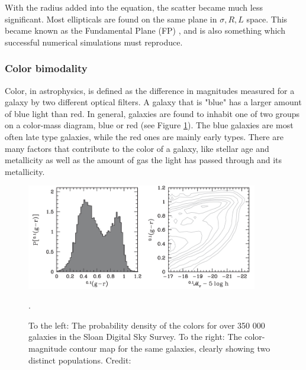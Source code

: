 With the radius added into the equation, the scatter became much less significant. Most ellipticals are found on the same plane in ${\sigma, R, L}$ space. This became known as the Fundamental Plane (FP) \parencite{Djorgovski1987}, and is also something which successful numerical simulations must reproduce.

\subsubsection{Color bimodality}
Color, in astrophysics, is defined as the difference in magnitudes measured for a galaxy by two different optical filters. A galaxy that is "blue" has a larger amount of blue light than red. In general, galaxies are found to inhabit one of two groups on a color-mass diagram, blue or red (see Figure \ref{color_bimodality}). The blue galaxies are most often late type galaxies, while the red ones are mainly early types. There are many factors that contribute to the color of a galaxy, like stellar age and metallicity as well as the amount of gas the light has passed through and its metallicity.

\begin{figure}
    \centering
    \includegraphics[width=0.9\textwidth]{images/color_bimodality.png}
    \caption{To the left: The probability density of the colors for over 350 000 galaxies in the Sloan Digital Sky Survey. To the right: The color-magnitude contour map for the same galaxies, clearly showing two distinct populations. Credit: \textcite{Mo2010}}.
    \label{color_bimodality}
\end{figure}

